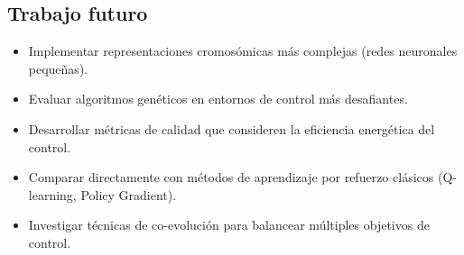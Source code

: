 \documentclass[12pt,a4paper]{article}
\begin{document}
\subsection*{Trabajo futuro}
\begin{itemize}
    \item Implementar representaciones cromosómicas más complejas (redes neuronales pequeñas).
    \item Evaluar algoritmos genéticos en entornos de control más desafiantes.
    \item Desarrollar métricas de calidad que consideren la eficiencia energética del control.
    \item Comparar directamente con métodos de aprendizaje por refuerzo clásicos (Q-learning, Policy Gradient).
    \item Investigar técnicas de co-evolución para balancear múltiples objetivos de control.
\end{itemize}
\end{document}
